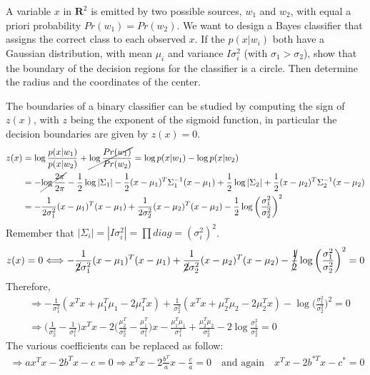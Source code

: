 \Exercise[number={3}]
A variable \(x\) in \(\mathbf{R}^2\) is emitted by two possible sources,
\(w_1\) and \(w_2\), with equal a priori probability \(Pr(w_1)=Pr(w_2)\). 
We want to design a Bayes classifier that assigns the correct class to each
observed \(x\). If the \(p(x|w_i)\) both have a Gaussian distribution, with
mean \(\mu_i\) and variance \(I\sigma_i^2\) (with \(\sigma_1>\sigma_2\)),
show that the boundary of the decision regions for the classifier is a circle.
Then determine the radius and the coordinates of the center.

\Answer[number={3}]
The boundaries of a binary classifier can be studied by computing the
sign of \(z(x)\), with \(z\) being the exponent of the sigmoid function, in
particular the decision boundaries are given by \(z(x)=0\).
\begin{align*}
    z(x)
    &=\log{\frac{p(x|w_1)}{p(x|w_2)}} + \cancel{\log{\frac{Pr(w_1)}{Pr(w_2)}}}
    =\log{p(x|w_1)}-\log{p(x|w_2)}\\
    &=-\cancel{\log{\frac{2\pi}{2\pi}}}-\frac{1}{2}\log{|\Sigma_1|}-\frac{1}{2}(x-\mu_1)^T\Sigma_1^{-1}(x-\mu_1)+\frac{1}{2}\log{|\Sigma_2|}+\frac{1}{2}(x-\mu_2)^T\Sigma_2^{-1}(x-\mu_2)\\
    &=-\frac{1}{2\sigma_1^2}(x-\mu_1)^T(x-\mu_1)+\frac{1}{2\sigma_2^2}(x-\mu_2)^T(x-\mu_2)-\frac{1}{2}\log{\biggl(\frac{\sigma_1^2}{\sigma_2^2}\biggr)^2}
\end{align*}
Remember that \(|\Sigma_i|=|I\sigma_i^2|=\prod{diag}=(\sigma_i^2)^2\).
\begin{align*}
    z(x)=0
    \Longleftrightarrow
    -\frac{1}{\cancel{2}\sigma_1^2}(x-\mu_1)^T(x-\mu_1)+\frac{1}{\cancel{2}\sigma_2^2}(x-\mu_2)^T(x-\mu_2)-\cancel{\frac{1}{2}}\log{\biggl(\frac{\sigma_1^2}{\sigma_2^2}\biggr)^2}=0
\end{align*}
Therefore,
\begin{align*}
    &\Rightarrow
    -\frac{1}{\sigma_1^2}(x^Tx+\mu_1^T\mu_1-2\mu_1^Tx)+\frac{1}{\sigma_2^2}(x^Tx+\mu_2^T\mu_2-2\mu_2^Tx)-\log{\biggl(\frac{\sigma_1^2}{\sigma_2^2}\biggr)^2}=0\\
    &\Rightarrow
    \biggl(\frac{1}{\sigma_2^2}-\frac{1}{\sigma_1^2}\biggr)x^Tx-2\biggl(\frac{\mu_2^T}{\sigma_2^2}-\frac{\mu_1^T}{\sigma_1^2}\biggr)x-\frac{\mu_1^T\mu_1}{\sigma_1^2}+\frac{\mu_2^T\mu_2}{\sigma_2^2}-2\log{\frac{\sigma_1^2}{\sigma_2^2}}=0
\end{align*}
The various coefficients can be replaced as follow:
\begin{align*}
    \Rightarrow
    ax^Tx-2b^Tx-c=0
    \Rightarrow
    x^Tx-2\frac{b^T}{a}x-\frac{c}{a}=0
    \quad\text{and again}\quad
    x^Tx-2b^{*T}x-c^*=0
\end{align*}
